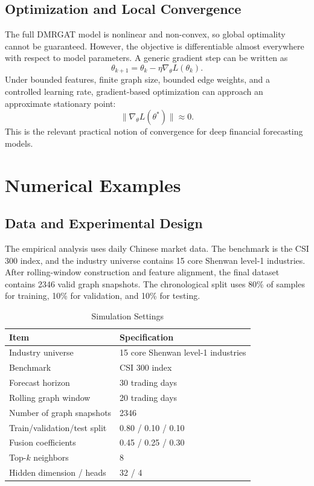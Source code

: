 \documentclass[12pt]{article}
\begin{document}
\subsection{Optimization and Local Convergence}

The full DMRGAT model is nonlinear and non-convex, so global optimality cannot be guaranteed. However, the objective is differentiable almost everywhere with respect to model parameters. A generic gradient step can be written as
\begin{equation}
\theta_{k+1}=\theta_k-\eta\nabla_{\theta}L(\theta_k).
\end{equation}
Under bounded features, finite graph size, bounded edge weights, and a controlled learning rate, gradient-based optimization can approach an approximate stationary point:
\begin{equation}
\|\nabla_{\theta}L(\theta^\ast)\|\approx 0.
\end{equation}
This is the relevant practical notion of convergence for deep financial forecasting models.

\section{Numerical Examples}
\label{sec:numerical}

\subsection{Data and Experimental Design}

The empirical analysis uses daily Chinese market data. The benchmark is the CSI 300 index, and the industry universe contains 15 core Shenwan level-1 industries. After rolling-window construction and feature alignment, the final dataset contains 2346 valid graph snapshots. The chronological split uses 80\% of samples for training, 10\% for validation, and 10\% for testing.

\begin{table}[H]
\centering
\caption{Simulation Settings}
\begin{tabular}{ll}
\toprule
Item & Specification \\
\midrule
Industry universe & 15 core Shenwan level-1 industries \\
Benchmark & CSI 300 index \\
Forecast horizon & 30 trading days \\
Rolling graph window & 20 trading days \\
Number of graph snapshots & 2346 \\
Train/validation/test split & 0.80 / 0.10 / 0.10 \\
Fusion coefficients & 0.45 / 0.25 / 0.30 \\
Top-$k$ neighbors & 8 \\
Hidden dimension / heads & 32 / 4 \\
\bottomrule
\end{tabular}
\end{table}
\end{document}
